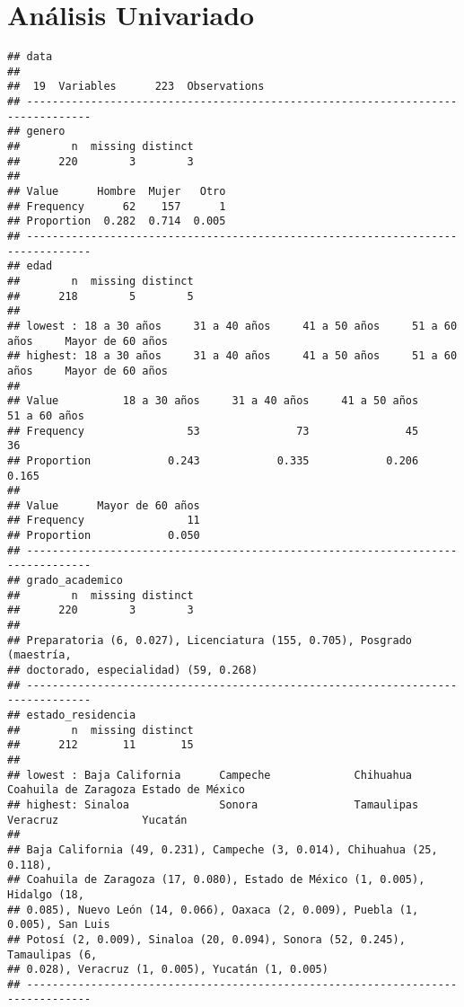 \documentclass[
]{book}
\begin{document}
\hypertarget{anuxe1lisis-univariado}{%
\section{Análisis Univariado}\label{anuxe1lisis-univariado}}

\begin{verbatim}
## data 
## 
##  19  Variables      223  Observations
## --------------------------------------------------------------------------------
## genero 
##        n  missing distinct 
##      220        3        3 
##                                
## Value      Hombre  Mujer   Otro
## Frequency      62    157      1
## Proportion  0.282  0.714  0.005
## --------------------------------------------------------------------------------
## edad 
##        n  missing distinct 
##      218        5        5 
## 
## lowest : 18 a 30 años     31 a 40 años     41 a 50 años     51 a 60 años     Mayor de 60 años
## highest: 18 a 30 años     31 a 40 años     41 a 50 años     51 a 60 años     Mayor de 60 años
##                                                                               
## Value          18 a 30 años     31 a 40 años     41 a 50 años     51 a 60 años
## Frequency                53               73               45               36
## Proportion            0.243            0.335            0.206            0.165
##                            
## Value      Mayor de 60 años
## Frequency                11
## Proportion            0.050
## --------------------------------------------------------------------------------
## grado_academico 
##        n  missing distinct 
##      220        3        3 
## 
## Preparatoria (6, 0.027), Licenciatura (155, 0.705), Posgrado (maestría,
## doctorado, especialidad) (59, 0.268)
## --------------------------------------------------------------------------------
## estado_residencia 
##        n  missing distinct 
##      212       11       15 
## 
## lowest : Baja California      Campeche             Chihuahua            Coahuila de Zaragoza Estado de México    
## highest: Sinaloa              Sonora               Tamaulipas           Veracruz             Yucatán             
## 
## Baja California (49, 0.231), Campeche (3, 0.014), Chihuahua (25, 0.118),
## Coahuila de Zaragoza (17, 0.080), Estado de México (1, 0.005), Hidalgo (18,
## 0.085), Nuevo León (14, 0.066), Oaxaca (2, 0.009), Puebla (1, 0.005), San Luis
## Potosí (2, 0.009), Sinaloa (20, 0.094), Sonora (52, 0.245), Tamaulipas (6,
## 0.028), Veracruz (1, 0.005), Yucatán (1, 0.005)
## --------------------------------------------------------------------------------

\end{verbatim}
\end{document}
